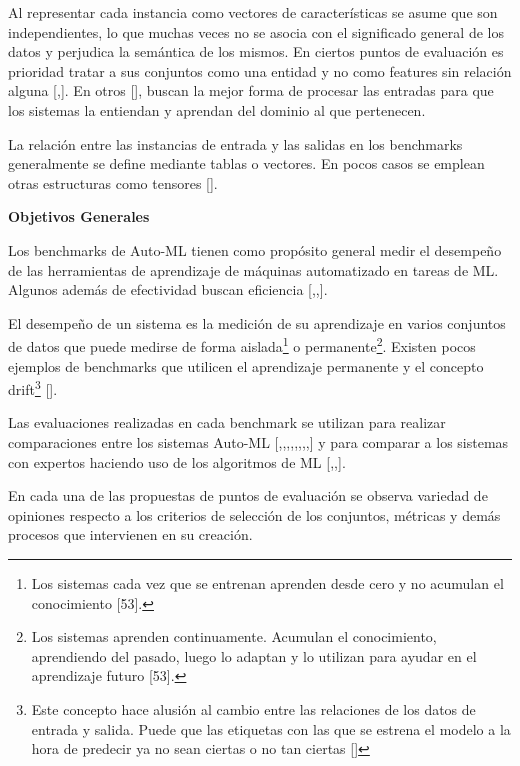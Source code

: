 Al representar cada instancia como vectores de características se asume que son independientes, lo que muchas veces no se asocia con el significado general de los datos y 
perjudica la semántica de los mismos. En ciertos puntos de evaluación es prioridad tratar a sus conjuntos como una entidad y no como features sin relación 
alguna [\cite{29},\cite{23}]. En otros [\cite{27}], buscan la mejor forma de procesar las entradas para que los sistemas la entiendan y aprendan del 
dominio al que pertenecen.

La relación entre las instancias de entrada y las salidas en los benchmarks generalmente se define mediante tablas o vectores. En pocos casos se emplean otras estructuras 
como tensores [\cite{29}].

\begin{flushleft} 
    {\large { \textbf{Objetivos Generales}}}\label{subsection:obj Auto-ML}
\end{flushleft}
Los benchmarks de Auto-ML tienen como propósito general medir el desempeño de las 
herramientas de aprendizaje de máquinas automatizado en tareas de ML. Algunos además de efectividad buscan eficiencia [\cite{11},\cite{12},\cite{29}].

El desempeño de un sistema es la medición de su aprendizaje en varios conjuntos de datos que puede medirse de forma aislada\footnote{Los sistemas cada vez 
que se entrenan aprenden desde cero y no acumulan el conocimiento [53].} o permanente\footnote{Los sistemas aprenden continuamente. Acumulan el conocimiento, 
aprendiendo del pasado, luego lo adaptan y lo utilizan para ayudar en el aprendizaje futuro [53].}. Existen pocos ejemplos de benchmarks que utilicen el aprendizaje 
permanente y el concepto drift\footnote{Este concepto hace alusión al cambio entre las relaciones de los datos de entrada y salida. Puede que las etiquetas con las que 
se estrena el modelo a la hora de predecir ya no sean ciertas o no tan ciertas [\cite{54}] } [\cite{12}].

Las evaluaciones realizadas en cada benchmark se utilizan para realizar comparaciones entre los sistemas Auto-ML
[\cite{10},\cite{15},\cite{31},\cite{17},\cite{14},\cite{23},\cite{32},\cite{18},\cite{24}] y para comparar a los sistemas con expertos haciendo uso de los algoritmos 
de ML [\cite{21},\cite{20},\cite{19}].

En cada una de las propuestas de puntos de evaluación se observa variedad de opiniones respecto a los criterios de selección de los conjuntos, métricas y demás 
procesos que intervienen en su creación.

